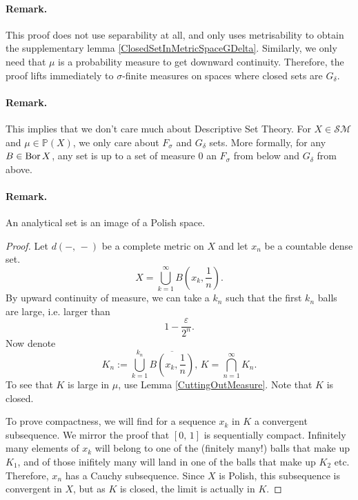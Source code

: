 \paragraph{Remark.} This proof does not use separability at all, and only uses metrisability to obtain the supplementary lemma \ref{ClosedSetInMetricSpaceGDelta}. Similarly, we only need that \( \mu \) is a probability measure to get downward continuity. Therefore, the proof lifts immediately to \( \sigma \)-finite measures on spaces where closed sets are \( G_\delta \).

\paragraph{Remark.} This implies that we don't care much about Descriptive Set Theory. For \( X \in \mathcal{SM} \) and \( \mu \in \mathbb{P}(X) \), we only care about \( F_\sigma \) and \( G_\delta \) sets. More formally, for any \( B \in \operatorname{Bor} X \), any set is up to a set of measure \( 0 \) an \( F_\sigma \) from below and \( G_\delta \) from above.

\paragraph{Remark.} An analytical set is an image of a Polish space.


\begin{proof}
Let \( d(-,\, -) \) be a complete metric on \( X \) and let \( x_n \) be a countable dense set. 
\[ 
    X = \bigcup_{k = 1}^\infty B \left( x_k, \frac{1}{n} \right). 
\]
By upward continuity of measure, we can take a \( k_n \) such that the first \( k_n \) balls are large, i.e. larger than
\[ 
1 - \frac{\varepsilon}{2^n}. 
\]
Now denote
\[ 
    K_n := \bigcup_{k = 1}^{k_n} \overline{B \left( x_k, \frac{1}{n} \right)},\, K = \bigcap_{n = 1}^\infty K_n.
\]
To see that \( K \) is large in \( \mu \), use Lemma \ref{CuttingOutMeasure}. Note that \( K \) is closed.

To prove compactness, we will find for a sequence \( x_k \) in \( K \) a convergent subsequence. We mirror the proof that \( [0,\,1] \) is sequentially compact. Infinitely many elements of \( x_k \) will belong to one of the (finitely many!) balls that make up \( K_1 \), and of those inifitely many will land in one of the balls that make up \( K_2 \) etc. Therefore, \( x_n \) has a Cauchy subsequence. Since \( X \) is Polish, this subsequence is convergent in \( X \), but as \( K \) is closed, the limit is actually in \( K \).
\end{proof}

